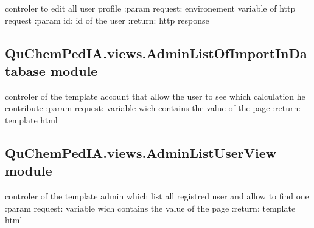 \documentclass[letterpaper,10pt,english]{sphinxmanual}
\begin{document}
\begin{fulllineitems}
\label{\detokenize{QuChemPedIA.views:QuChemPedIA.views.AdminEditUserView.admin_edit_user}}
controler to edit all user profile
:param request: environement variable of http request
:param id: id of the user
:return: http response

\end{fulllineitems}



\subsection{QuChemPedIA.views.AdminListOfImportInDatabase module}
\label{\detokenize{QuChemPedIA.views:module-QuChemPedIA.views.AdminListOfImportInDatabase}}\label{\detokenize{QuChemPedIA.views:quchempedia-views-adminlistofimportindatabase-module}}

\begin{fulllineitems}
\label{\detokenize{QuChemPedIA.views:QuChemPedIA.views.AdminListOfImportInDatabase.list_of_import_in_database}}
controler of the template account that allow the user to see which calculation he contribute
:param request: variable wich contains the value of the page
:return: template html

\end{fulllineitems}



\subsection{QuChemPedIA.views.AdminListUserView module}
\label{\detokenize{QuChemPedIA.views:module-QuChemPedIA.views.AdminListUserView}}\label{\detokenize{QuChemPedIA.views:quchempedia-views-adminlistuserview-module}}

\begin{fulllineitems}
\label{\detokenize{QuChemPedIA.views:QuChemPedIA.views.AdminListUserView.list_of_all_user}}
controler of the template admin which list all registred user and allow to find one
:param request: variable wich contains the value of the page
:return: template html

\end{fulllineitems}
\end{document}
